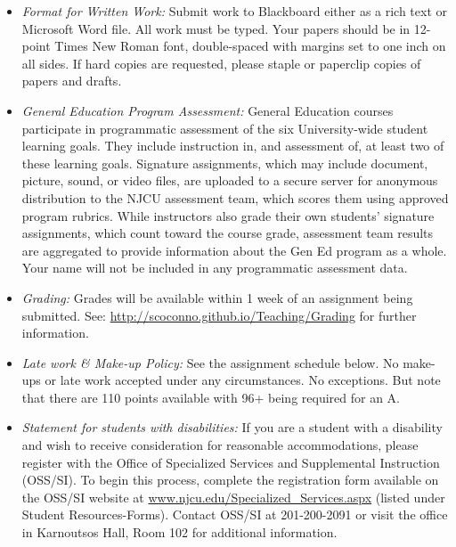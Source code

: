 \documentclass[article,oneside]{memoir}
\begin{document}
\begin{itemize}
\item \textit{Format for Written Work:} Submit work to Blackboard either as a rich text or Microsoft Word file. All work must be typed. Your papers should be in 12-point Times New Roman font, double-spaced with margins set to one inch on all sides. If hard copies are requested, please staple or paperclip copies of papers and drafts.


\item \textit{General Education Program Assessment:} General Education courses participate in programmatic assessment of the six University-wide student learning goals. They include instruction in, and assessment of, at least two of these learning goals. Signature assignments, which may include document, picture, sound, or video files, are uploaded to a secure server for anonymous distribution to the NJCU assessment team, which scores them using approved program rubrics. While instructors also grade their own students’ signature assignments, which count toward the course grade, assessment team results are aggregated to provide information about the Gen Ed program as a whole. Your name will not be included in any programmatic assessment data.

\item \textit{Grading:} Grades will be available within 1 week of an assignment being submitted. See: \href{http://scoconno.github.io/Teaching/Grading}{http://scoconno.github.io/Teaching/Grading} for further information.


\item \textit{Late work \& Make-up Policy:} See the assignment schedule below. No make-ups or late work accepted under any circumstances. No exceptions. But note that there are 110 points available with 96+ being required for an A.


\item \textit{Statement for students with disabilities:} If you are a student
with a disability and wish to receive consideration for reasonable
accommodations, please register with the Office of Specialized Services
and Supplemental Instruction (OSS/SI). To begin this process, complete
the registration form available on the OSS/SI website at
\href{http://www.njcu.edu/Specialized_Services.aspx}{www.njcu.edu/Specialized\_Services.aspx}
(listed under Student Resources-Forms). Contact OSS/SI at 201-200-2091
or visit the office in Karnoutsos Hall, Room 102 for additional
information.

\end{itemize}
\end{document}

